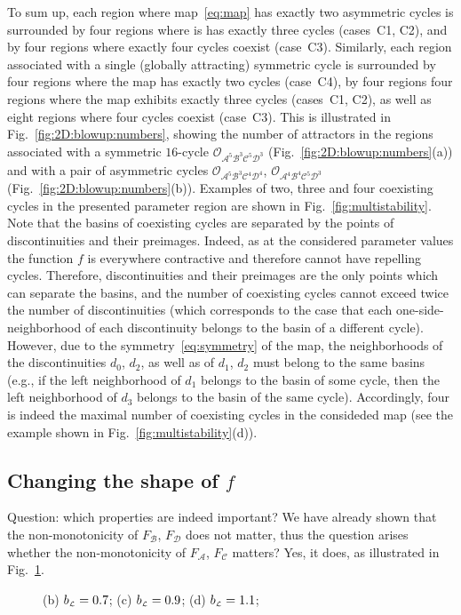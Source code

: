 \documentclass[10pt]{article}
\newif\ifFigs       \Figsfalse
\newcommand{\A}{{\mathcal A}}
\newcommand{\B}{{\mathcal B}}
\newcommand{\C}{{\mathcal C}}
\newcommand{\D}{{\mathcal D}}
\renewcommand{\l}{\text{\tiny $\mathcal L$}}
\newcommand{\LC}{{\mathcal O}}
\newcommand{\FA}{F_\A}
\newcommand{\FB}{F_\B}
\newcommand{\FC}{F_\C}
\newcommand{\FD}{F_\D}
\newcommand{\bL}{b_\l}
\newcommand{\Includegraphics}[2]%
           {\centering
             \ifFigs\texttt{[image: \#2]}%
             \else  \texttt{[image: \#2]}\fi}
\newcommand{\Includesubgraphics}[3]%
{\begin{minipage}[b]{#1}
    \Includegraphics{\textwidth}{#2}\\
    \centerline{{\footnotesize (#3)}}
  \end{minipage}
}
\begin{document}
To sum up, each region where map~\eqref{eq:map} has exactly two
asymmetric cycles is surrounded by four regions where is has exactly
three cycles (cases~C1, C2), and by four regions where exactly four
cycles coexist (case~C3).  Similarly, each region associated with a
single (globally attracting) symmetric cycle is surrounded by four
regions where the map has exactly two cycles (case~C4), by four
regions four regions where the map exhibits exactly three cycles
(cases~C1, C2), as well as eight regions where four cycles coexist
(case~C3).  This is illustrated in Fig.~\ref{fig:2D:blowup:numbers},
showing the number of attractors in the regions associated with a
symmetric $16$-cycle $\LC_{\A^5\B^3\C^5\D^3}$
(Fig.~\ref{fig:2D:blowup:numbers}(a)) and with a pair of asymmetric
cycles $\LC_{\A^{5}\B^3\C^{4}\D^{4}}$, $\LC_{\A^{4}\B^{4}\C^{5}\D^3}$
(Fig.~\ref{fig:2D:blowup:numbers}(b)).  Examples of two, three and
four coexisting cycles in the presented parameter region are shown in
Fig.~\ref{fig:multistability}. Note that the basins of coexisting
cycles are separated by the points of discontinuities and their
preimages. Indeed, as at the considered parameter values the function
$f$ is everywhere contractive and therefore cannot have repelling
cycles. Therefore, discontinuities and their preimages are the only
points which can separate the basins, and the number of coexisting
cycles cannot exceed twice the number of discontinuities (which
corresponds to the case that each one-side-neighborhood of each
discontinuity belongs to the basin of a different cycle). However, due
to the symmetry~\ref{eq:symmetry} of the map, the neighborhoods of the
discontinuities $d_0$, $d_2$, as well as of $d_1$, $d_2$ must belong
to the same basins (e.g., if the left neighborhood of $d_1$ belongs to
the basin of some cycle, then the left neighborhood of $d_3$ belongs
to the basin of the same cycle). Accordingly, four is indeed the
maximal number of coexisting cycles in the consideded map
(see the example shown in Fig.~\ref{fig:multistability}(d)).

\clearpage
\subsection{Changing the shape of $f$}
Question: which properties are indeed important? We have already shown
that the non-monotonicity of $\FB$, $\FD$ does not matter, thus the
question arises whether the non-monotonicity of $\FA$, $\FC$ matters?
Yes, it does, as illustrated in Fig.~\ref{fig:vaying}.

\begin{figure}[t]
	\caption{\label{fig:vaying}
		(b) $\bL=0.7$;
		(c) $\bL=0.9$;
		(d) $\bL=1.1$;
	}
	\vspace*{-1em}
\end{figure}
\end{document}

